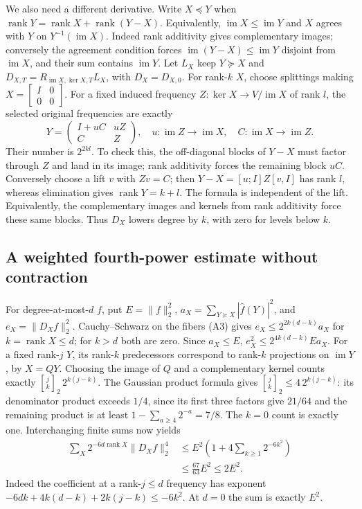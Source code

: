 We also need a different derivative. Write $X\preceq Y$ when
$\operatorname{rank}Y=\operatorname{rank}X+\operatorname{rank}(Y-X)$.
Equivalently, $\operatorname{im}X\le\operatorname{im}Y$ and $X$ agrees
with $Y$ on $Y^{-1}(\operatorname{im}X)$. Indeed rank additivity gives
complementary images; conversely the agreement condition forces
$\operatorname{im}(Y-X)\le\operatorname{im}Y$ disjoint from
$\operatorname{im}X$, and their sum contains $\operatorname{im}Y$.
Let $L_X$ keep $Y\succeq X$ and
$D_{X,T}=R_{\operatorname{im}X,\ker X,T}L_X$, with $D_X=D_{X,0}$.
For rank-$k$ $X$, choose splittings making $X=\left[\begin{smallmatrix}I&0\\0&0\end{smallmatrix}\right]$.
For a fixed induced frequency $Z:\ker X\to V/\operatorname{im}X$ of
rank $l$, the selected original frequencies are exactly
\[
 Y=\begin{pmatrix}I+uC&uZ\\ C&Z\end{pmatrix},
 \quad u:\operatorname{im}Z\to\operatorname{im}X,
 \quad C:\operatorname{im}X\to\operatorname{im}Z.     \tag{A3}
\]
Their number is $2^{2kl}$. To check this, the off-diagonal blocks of
$Y-X$ must factor through $Z$ and land in its image; rank additivity
forces the remaining block $uC$. Conversely choose a lift $v$ with
$Zv=C$; then $Y-X=[u;I]Z[v,I]$ has rank $l$, whereas elimination gives
$\operatorname{rank}Y=k+l$. The formula is independent of the lift.
Equivalently, the complementary images and kernels from rank additivity
force these same blocks. Thus $D_X$ lowers degree by $k$, with zero for
levels below $k$.

\subsection{A weighted fourth-power estimate without contraction}
For degree-at-most-$d$ $f$, put $E=\|f\|_2^2$,
$a_X=\sum_{Y\succeq X}|\widehat f(Y)|^2$, and $e_X=\|D_Xf\|_2^2$.
Cauchy--Schwarz on the fibers (A3) gives
$e_X\le2^{2k(d-k)}a_X$ for $k=\operatorname{rank}X\le d$; for $k>d$
both are zero. Since $a_X\le E$,
$e_X^2\le2^{4k(d-k)}Ea_X$.
For a fixed rank-$j$ $Y$, its rank-$k$ predecessors correspond to rank-$k$
projections on $\operatorname{im}Y$, by $X=QY$. Choosing the image of
$Q$ and a complementary kernel counts exactly
${j\brack k}_2\,2^{k(j-k)}$. The Gaussian product formula gives
${j\brack k}_2\le4\,2^{k(j-k)}$: its denominator product exceeds
$1/4$, since its first three factors give $21/64$ and the remaining
product is at least $1-\sum_{a\ge4}2^{-a}=7/8$.
The $k=0$ count is exactly one. Interchanging finite sums now yields
\[
 \begin{split}
 \sum_X2^{-6d\operatorname{rank}X}\|D_Xf\|_2^4
 &\le E^2\left(1+4\sum_{k\ge1}2^{-6k^2}\right)\\
 &\le\frac{67}{63}E^2\le2E^2.                       \end{split}\tag{W6}
\]
Indeed the coefficient at a rank-$j\le d$ frequency has exponent
$-6dk+4k(d-k)+2k(j-k)\le-6k^2$.
At $d=0$ the sum is exactly $E^2$.

